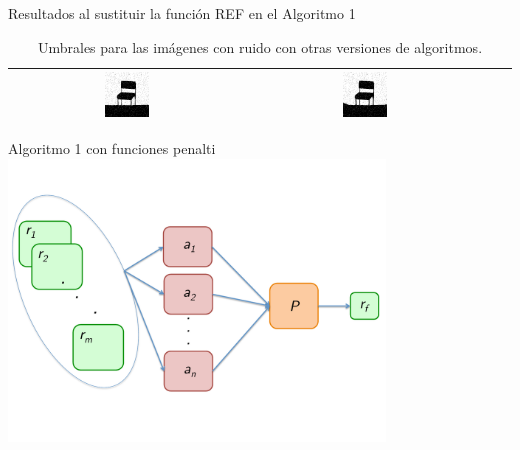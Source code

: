 \documentclass{beamer}
\theoremstyle{plain} %
\theoremstyle{definition}
\begin{document}
\begin{frame}{Resultados al sustituir la función REF en el Algoritmo 1}
\begin{table}
\begin{tabular}{c||c|c|c}
  \includegraphics[width=0.2\textwidth]{img/res/e1a/alg1tipo6d0.75-chairsp005.jpg} &
  \includegraphics[width=0.2\textwidth]{img/res/e1a/alg1tipo6d1.25-chairsp005.jpg} \\\hline
  \end{tabular}
  \caption{Umbrales para las imágenes con ruido con otras versiones de algoritmos.\label{tab:resultexp1imagenesruido}}
\end{table}
\end{frame}

\begin{frame}{Algoritmo 1 con funciones penalti}
  \centering
  \includegraphics[width=10cm]{graficos/esquemaPenalti.pdf}
\end{frame}
\end{document}
